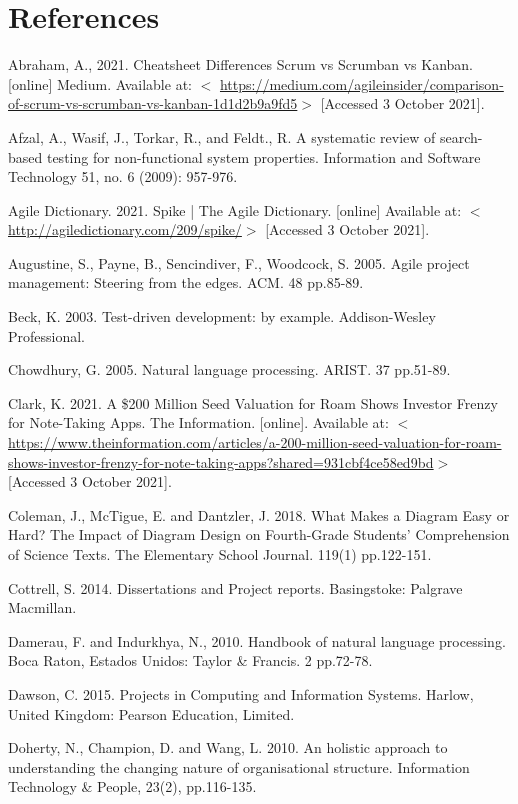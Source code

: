 \documentclass{article}
\begin{document}
\section{References}
{\parindent0pt
Abraham, A., 2021. Cheatsheet Differences Scrum vs Scrumban vs Kanban. [online] Medium. Available at: $<$ \url{https://medium.com/agileinsider/comparison-of-scrum-vs-scrumban-vs-kanban-1d1d2b9a9fd5}$>$ [Accessed 3 October 2021].

Afzal, A., Wasif, J., Torkar, R., and Feldt., R. A systematic review of search-based testing for non-functional system properties. Information and Software Technology 51, no. 6 (2009): 957-976.

Agile Dictionary. 2021. Spike | The Agile Dictionary. [online] Available at: $<$ \url{http://agiledictionary.com/209/spike/}$>$ [Accessed 3 October 2021].

Augustine, S., Payne, B., Sencindiver, F., Woodcock, S. 2005. Agile project management: Steering from the edges. ACM. 48 pp.85-89.

Beck, K. 2003. Test-driven development: by example. Addison-Wesley Professional.

Chowdhury, G. 2005. Natural language processing. ARIST. 37 pp.51-89. 

Clark, K. 2021. A \$200 Million Seed Valuation for Roam Shows Investor Frenzy for Note-Taking Apps. The Information. [online]. Available at: $<$ \url{https://www.theinformation.com/articles/a-200-million-seed-valuation-for-roam-shows-investor-frenzy-for-note-taking-apps?shared=931cbf4ce58ed9bd}$>$ [Accessed 3 October 2021].

Coleman, J., McTigue, E. and Dantzler, J. 2018. What Makes a Diagram Easy or Hard? The Impact of Diagram Design on Fourth-Grade Students’ Comprehension of Science Texts. The Elementary School Journal. 119(1) pp.122-151.

Cottrell, S. 2014. Dissertations and Project reports. Basingstoke: Palgrave Macmillan.

Damerau, F. and Indurkhya, N., 2010. Handbook of natural language processing. Boca Raton, Estados Unidos: Taylor & Francis. 2 pp.72-78.

Dawson, C. 2015. Projects in Computing and Information Systems. Harlow, United Kingdom: Pearson Education, Limited.

Doherty, N., Champion, D. and Wang, L. 2010. An holistic approach to understanding the changing nature of organisational structure. Information Technology & People, 23(2), pp.116-135.

}
\end{document}
